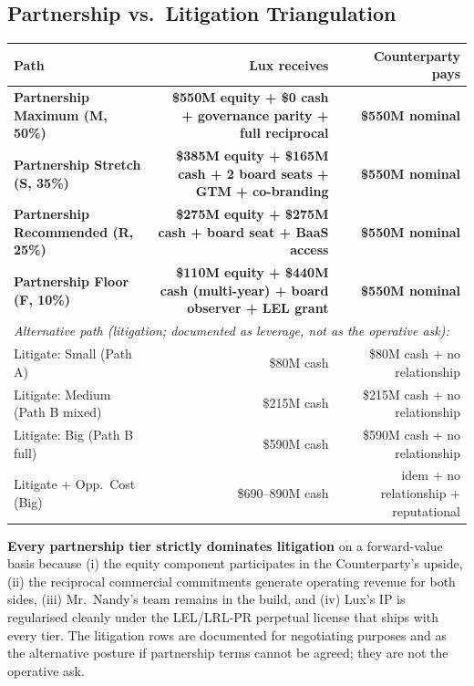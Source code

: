 \documentclass[11pt,letterpaper]{article}
\begin{document}
\subsection*{Partnership vs.\ Litigation Triangulation}

\begin{center}
\begin{small}
\begin{tabular}{lrr}
\toprule
\textbf{Path} & \textbf{Lux receives} & \textbf{Counterparty pays} \\
\midrule
\textbf{Partnership Maximum (M, 50\%)}        & \textbf{\$550M equity + \$0 cash + governance parity + full reciprocal} & \textbf{\$550M nominal} \\
\textbf{Partnership Stretch (S, 35\%)}        & \textbf{\$385M equity + \$165M cash + 2 board seats + GTM + co-branding} & \textbf{\$550M nominal} \\
\textbf{Partnership Recommended (R, 25\%)}    & \textbf{\$275M equity + \$275M cash + board seat + BaaS access} & \textbf{\$550M nominal} \\
\textbf{Partnership Floor (F, 10\%)}          & \textbf{\$110M equity + \$440M cash (multi-year) + board observer + LEL grant} & \textbf{\$550M nominal} \\
\midrule
\multicolumn{3}{l}{\textit{Alternative path (litigation; documented as leverage, not as the operative ask):}} \\
Litigate: Small (Path A)                  & \$80M cash & \$80M cash + no relationship \\
Litigate: Medium (Path B mixed)           & \$215M cash & \$215M cash + no relationship \\
Litigate: Big (Path B full)               & \$590M cash & \$590M cash + no relationship \\
Litigate + Opp.\ Cost (Big)               & \$690--890M cash & idem + no relationship + reputational \\
\bottomrule
\end{tabular}
\end{small}
\end{center}

\textbf{Every partnership tier strictly dominates litigation} on a
forward-value basis because (i) the equity component participates in
the Counterparty's upside, (ii) the reciprocal commercial commitments
generate operating revenue for both sides, (iii) Mr.\ Nandy's team
remains in the build, and (iv) Lux's IP is regularised cleanly under
the LEL/LRL-PR perpetual license that ships with every tier. The
litigation rows are documented for negotiating purposes and as the
alternative posture if partnership terms cannot be agreed; they are
not the operative ask.
\end{document}
